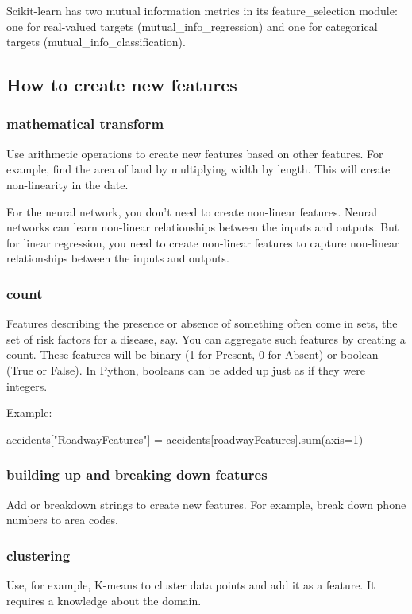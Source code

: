 \documentclass[12pt]{report}
\begin{document}
Scikit-learn has two mutual information metrics in its feature\_selection module: one for real-valued targets (mutual\_info\_regression) and one for categorical targets (mutual\_info\_classification).

\subsection{How to create new features}

\subsubsection{mathematical transform}
Use arithmetic operations to create new features based on other features. For example, find the area of land by multiplying width by length. This will create non-linearity in the date.

For the neural network, you don't need to create non-linear features. Neural networks can learn non-linear relationships between the inputs and outputs. But for linear regression, you need to create non-linear features to capture non-linear relationships between the inputs and outputs.


\subsubsection{count}
Features describing the presence or absence of something often come in sets, the set of risk factors for a disease, say. You can aggregate such features by creating a count. These features will be binary (1 for Present, 0 for Absent) or boolean (True or False). In Python, booleans can be added up just as if they were integers.

Example:

accidents["RoadwayFeatures"] = accidents[roadwayFeatures].sum(axis=1)

\subsubsection{building up and breaking down features}
Add or breakdown strings to create new features. For example, break down phone numbers to area codes.

\subsubsection{clustering}
Use, for example, K-means to cluster data points and add it as a feature. It requires a knowledge about the domain.
\end{document}

